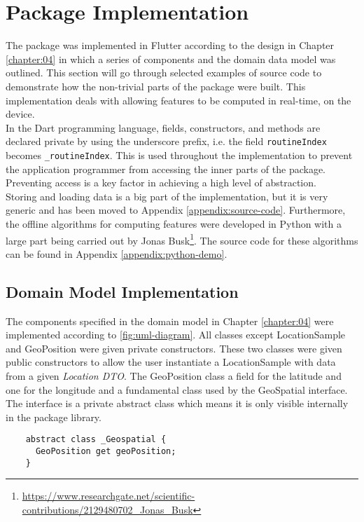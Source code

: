\section{Package Implementation}
The package was implemented in Flutter according to the design in Chapter \ref{chapter:04} in which a series of components and the domain data model was outlined. This section will go through selected examples of source code to demonstrate how the non-trivial parts of the package were built. This implementation deals with allowing features to be computed in real-time, on the device.\\

In the Dart programming language, fields, constructors, and methods are declared private by using the underscore prefix, i.e. the field \verb|routineIndex| becomes \verb|_routineIndex|. This is used throughout the implementation to prevent the application programmer from accessing the inner parts of the package. Preventing access is a key factor in achieving a high level of abstraction.\\

Storing and loading data is a big part of the implementation, but it is very generic and has been moved to Appendix \ref{appendix:source-code}. Furthermore, the offline algorithms for computing features were developed in Python with a large part being carried out by Jonas Busk\footnote{\url{https://www.researchgate.net/scientific-contributions/2129480702_Jonas_Busk}}. The source code for these algorithms can be found in Appendix \ref{appendix:python-demo}.

\subsection{Domain Model Implementation}
The components specified in the domain model in Chapter \ref{chapter:04} were implemented according to \ref{fig:uml-diagram}. All classes except LocationSample and GeoPosition were given private constructors. These two classes were given public constructors to allow the user instantiate a LocationSample with data from a given \textit{Location DTO}. The GeoPosition class a field for the latitude and one for the longitude and a fundamental class used by the GeoSpatial interface. The interface is a private abstract class which means it is only visible internally in the package library.

\begin{verbatim}
    abstract class _Geospatial {
      GeoPosition get geoPosition;
    }
\end{verbatim}

